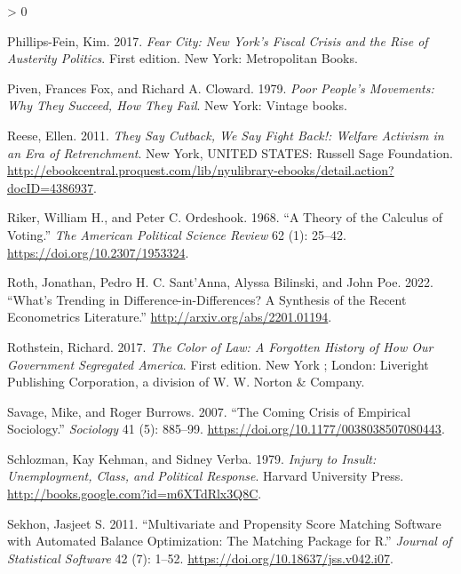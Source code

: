 \documentclass[
  12pt,
]{article}
\newlength{\cslhangindent}
\newenvironment{CSLReferences}[2] %
 {%
  \setlength{\parindent}{0pt}
  \ifodd #1 \everypar{\setlength{\hangindent}{\cslhangindent}}\ignorespaces\fi
  \ifnum #2 > 0
  \setlength{\parskip}{#2\baselineskip}
  \fi
 }%
 {}
\begin{document}
\begin{CSLReferences}{1}{0}
\leavevmode\hypertarget{ref-Phillips-Fein2017}{}%
Phillips-Fein, Kim. 2017. \emph{Fear City: {New York}'s Fiscal Crisis and the Rise of Austerity Politics}. First edition. {New York}: {Metropolitan Books}.

\leavevmode\hypertarget{ref-Piven1979}{}%
Piven, Frances Fox, and Richard A. Cloward. 1979. \emph{Poor People's Movements: Why They Succeed, How They Fail}. {New York}: {Vintage books}.

\leavevmode\hypertarget{ref-Reese2011}{}%
Reese, Ellen. 2011. \emph{They {Say Cutback}, {We Say Fight Back}!: {Welfare Activism} in an {Era} of {Retrenchment}}. {New York, UNITED STATES}: {Russell Sage Foundation}. \url{http://ebookcentral.proquest.com/lib/nyulibrary-ebooks/detail.action?docID=4386937}.

\leavevmode\hypertarget{ref-Riker1968}{}%
Riker, William H., and Peter C. Ordeshook. 1968. {``A {Theory} of the {Calculus} of {Voting}.''} \emph{The American Political Science Review} 62 (1): 25--42. \url{https://doi.org/10.2307/1953324}.

\leavevmode\hypertarget{ref-Roth2022}{}%
Roth, Jonathan, Pedro H. C. Sant'Anna, Alyssa Bilinski, and John Poe. 2022. {``What's {Trending} in {Difference-in-Differences}? {A Synthesis} of the {Recent Econometrics Literature}.''} \url{http://arxiv.org/abs/2201.01194}.

\leavevmode\hypertarget{ref-Rothstein2017}{}%
Rothstein, Richard. 2017. \emph{The Color of Law: A Forgotten History of How Our Government Segregated {America}}. First edition. {New York ; London}: {Liveright Publishing Corporation, a division of W. W. Norton \& Company}.

\leavevmode\hypertarget{ref-Savage2007}{}%
Savage, Mike, and Roger Burrows. 2007. {``The {Coming Crisis} of {Empirical Sociology}.''} \emph{Sociology} 41 (5): 885--99. \url{https://doi.org/10.1177/0038038507080443}.

\leavevmode\hypertarget{ref-Schlozman1979}{}%
Schlozman, Kay Kehman, and Sidney Verba. 1979. \emph{Injury to {Insult}: {Unemployment}, {Class}, and {Political Response}}. {Harvard University Press}. \url{http://books.google.com?id=m6XTdRlx3Q8C}.

\leavevmode\hypertarget{ref-Sekhon2011}{}%
Sekhon, Jasjeet S. 2011. {``Multivariate and {Propensity Score Matching Software} with {Automated Balance Optimization}: {The Matching} Package for {R}.''} \emph{Journal of Statistical Software} 42 (7): 1--52. \url{https://doi.org/10.18637/jss.v042.i07}.


\end{CSLReferences}
\end{document}
